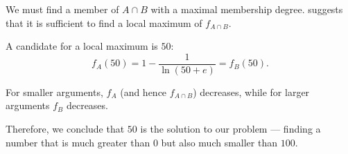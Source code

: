 \begin{example}
  We must find a member of \( A \cap B \) with a maximal membership degree.  suggests that it is sufficient to find a local maximum of \( f_{A \cap B} \).

  A candidate for a local maximum is \( 50 \):
  \begin{equation*}
    f_A(50) = 1 - \frac 1 {\ln(50 + e)} = f_B(50).
  \end{equation*}

  For smaller arguments, \( f_A \) (and hence \( f_{A \cap B} \)) decreases, while for larger arguments \( f_B \) decreases.

  Therefore, we conclude that \( 50 \) is the solution to our problem --- finding a number that is much greater than \( 0 \) but also much smaller than \( 100 \).
\end{example}
